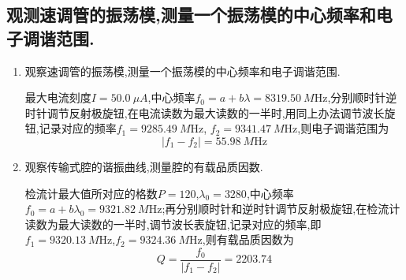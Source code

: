 \documentclass[a4paper]{article}
\begin{document}
\subsection{观测速调管的振荡模,测量一个振荡模的中心频率和电子调谐范围.}\label{sub1}
\begin{enumerate}[1)]
\item 观察速调管的振荡模,测量一个振荡模的中心频率和电子调谐范围.

最大电流刻度$I=\SI{50.0}{\mu A}$,中心频率$f_0=a+b\lambda=\SI{8319.50}{M\hertz}$,分别顺时针逆时针调节反射极旋钮,在电流读数为最大读数的一半时,用同上办法调节波长旋钮,记录对应的频率$f_1=\SI{9285.49}{M\hertz}$, $f_2=\SI{9341.47}{M\hertz}$,则电子调谐范围为
\begin{equation}
    |f_1-f_2|=\SI{55.98}{M\hertz}
\end{equation}
\item 观察传输式腔的谐振曲线,测量腔的有载品质因数.

检流计最大值所对应的格数$P=120$,$\lambda_0=3280$,中心频率$f_0=a+b\lambda_0=\SI{9321.82}{M\hertz}$;再分别顺时针和逆时针调节反射极旋钮,在检流计读数为最大读数的一半时,调节波长表旋钮,记录对应的频率,即$f_1=\SI{9320.13}{M\hertz}$,$f_2=\SI{9324.36}{M\hertz}$,则有载品质因数为
\begin{equation}
    Q=\frac{f_0}{|f_1-f_2|}=2203.74
\end{equation}
\end{enumerate}

\newpage
\end{document}
